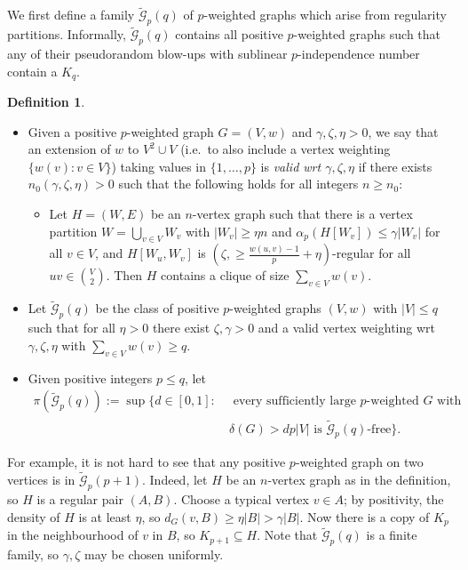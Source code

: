 \documentclass[10pt,a4paper]{article}
\theoremstyle{definition}
\newtheorem{definition}[theorem]{Definition}
\def\eps{{\varepsilon}}
\newcommand{\cG}{\mathcal{G}}
\begin{document}
We first define a family $\widetilde{\cG}_p(q)$ of $p$-weighted graphs which arise from regularity partitions.
Informally, $\widetilde{\cG}_p(q)$ contains all positive $p$-weighted graphs such that any of their pseudorandom blow-ups with sublinear $p$-independence number contain a $K_q$. 

\begin{definition}\label{def:Gpq}
	~
	
	\vspace{-0.3cm}
	\begin{itemize}
		\item Given a positive $p$-weighted graph $G=(V,w)$ and $\gamma,\zeta,\eta>0$, we say that an extension of $w$ to $V^2 \cup V$ (i.e.~to also include a vertex weighting $\lbrace w(v) : v \in V\rbrace$) taking values in $\lbrace 1,\ldots,p\rbrace$ is \emph{valid wrt $\gamma,\zeta,\eta$} if there exists $n_0(\gamma,\zeta,\eta)>0$ such that the following holds for all integers $n \geq n_0$:
		\begin{itemize}
			\item[] 
			Let $H = (W,E)$ be an $n$-vertex graph such that
			there is a vertex partition $W=\bigcup_{v \in V}W_v$ with $|W_v| \geq \eta n$ and $\alpha_p(H[W_v])\le \gamma|W_v|$ for all $v \in V$, and
			$H[W_u,W_v]$ is $(\zeta,\geq\!\frac{w(u,v)-1}{p}+\eta)$-regular for all $uv\in{V\choose 2}$.
			Then $H$ contains a clique of size $\sum_{v \in V}w(v)$.
		\end{itemize}
		
		\item Let $\widetilde{\mathcal{G}}_p(q)$ be the class of positive $p$-weighted graphs $(V,w)$ with $|V| \leq q$ such that for all $\eta>0$ there exist $\zeta,\gamma>0$ and a valid vertex weighting wrt $\gamma,\zeta,\eta$ with $\sum_{v \in V}w(v) \geq q$.
		\item Given positive integers $p \leq q$, let
		\begin{align*}
			\pi(\widetilde{\cG}_p(q)):=\sup\{d \in [0,1]:~&\text{ every sufficiently large } p\text{-weighted }G \text{ with }\\
			&\delta(G) > dp|V| \text{ is } \widetilde{\cG}_p(q)\text{-free} \}.
		\end{align*} 
	\end{itemize}
\end{definition}
For example, it is not hard to see that any positive $p$-weighted graph on two vertices is in $\widetilde{\cG}_p(p+1)$. 
Indeed, let $H$ be an $n$-vertex graph as in the definition, so $H$ is a regular pair $(A,B)$. Choose a typical vertex $v \in A$; by positivity, the density of $H$ is at least $\eta$, so $d_G(v,B) \geq \eta|B| > \gamma|B|$.
Now there is a copy of $K_p$ in the neighbourhood of $v$ in $B$, so $K_{p+1} \subseteq H$.
Note that $\widetilde{\cG}_p(q)$ is a finite family, so $\gamma,\zeta$ may be chosen uniformly.
\end{document}
